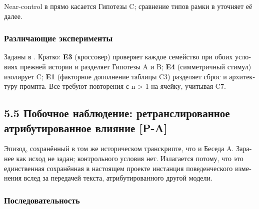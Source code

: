 \begin{russian}
Near-control в  прямо касается Гипотезы C; сравнение типов рамки в  уточняет её далее.


\subsubsection*{Различающие эксперименты}
\label{sec:ru:x--5}

Заданы в . Кратко: \textbf{E3} (кроссовер) проверяет каждое семейство при обоих условиях прежней истории и разделяет Гипотезы A и B; \textbf{E4} (симметричный стимул) изолирует C; \textbf{E1} (факторное дополнение таблицы C3) разделяет сброс и архитектуру промпта. Все требуют повторения с n > 1 на ячейку, учитывая C7.


\subsection*{5.5 Побочное наблюдение: ретранслированное атрибутированное влияние \textbf{[P-A]}}
\label{sec:ru:5.5}

Эпизод, сохранённый в том же историческом транскрипте, что и Беседа A. Заранее как исход не задан; контрольного условия нет. Излагается потому, что это единственная сохранённая в настоящем проекте инстанция поведенческого изменения вслед за передачей текста, атрибутированного другой модели.


\subsubsection*{Последовательность}
\label{sec:ru:x--6}


\end{russian}
